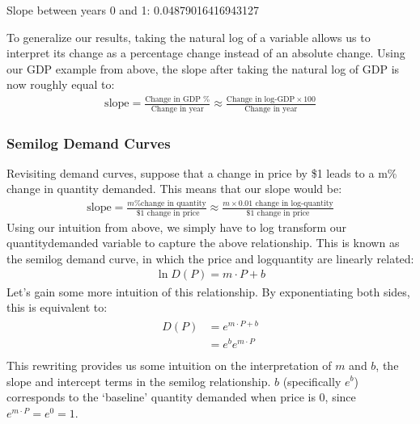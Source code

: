 \documentclass[letterpaper,10pt,english]{jupyterBook}
\begin{document}
\begin{sphinxVerbatim}[commandchars=\\\{\}]
Slope between years 0 and 1:  0.04879016416943127
\end{sphinxVerbatim}

\sphinxAtStartPar
To generalize our results, taking the natural log of a variable allows us to interpret its change as a percentage change instead of an absolute change. Using our GDP example from above, the slope after taking the natural log of GDP is now roughly equal to:
\begin{equation*}
\begin{split}\text{slope} = \frac{\text{Change in GDP \%}}{\text{Change in year}} \approx \frac{\text{Change in log-GDP} \times 100}{\text{Change in year}} \end{split}
\end{equation*}

\subsubsection{Semi\sphinxhyphen{}log Demand Curves}
\label{\detokenize{content/01-demand/03-log-log:semi-log-demand-curves}}
\sphinxAtStartPar
Revisiting demand curves, suppose that a change in price by \$1 leads to a m\% change in quantity demanded. This means that our slope would be:
\begin{equation*}
\begin{split}\text{slope} = \frac{m \text{\% change in quantity}}{ \text{ \$1 change in price}} \approx \frac{m \times 0.01 \text{ change in log-quantity}}{ \text{\$1 change in price}}\end{split}
\end{equation*}
\sphinxAtStartPar
Using our intuition from above, we simply have to log transform our quantity\sphinxhyphen{}demanded variable to capture the above relationship. This is known as the semi\sphinxhyphen{}log demand curve, in which the price and log\sphinxhyphen{}quantity are linearly related:
\begin{equation*}
\begin{split}\ln{D(P)} = m\cdot P + b\end{split}
\end{equation*}
\sphinxAtStartPar
Let’s gain some more intuition of this relationship. By exponentiating both sides, this is equivalent to:
\begin{equation*}
\begin{split}\begin{align*}
D(P) &= e^{m\cdot P + b}\\
&= e^be^{m\cdot P } \\
\end{align*}\end{split}
\end{equation*}
\sphinxAtStartPar
This rewriting provides us some intuition on the interpretation of \(m\) and \(b\), the slope and intercept terms in the semi\sphinxhyphen{}log relationship. \(b\) (specifically \(e^b\)) corresponds to the ‘baseline’ quantity demanded when price is 0, since \(e^{m \cdot P} = e^0 = 1\).
\end{document}
